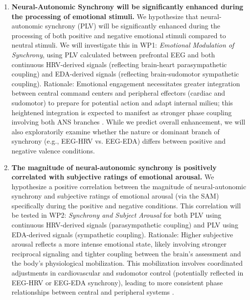 \documentclass[12pt]{article} %
\begin{document}
\begin{enumerate}[label=(\alph*)]
    \item \textbf{Neural-Autonomic Synchrony will be significantly enhanced during the processing of emotional stimuli.} We hypothesize that neural-autonomic synchrony (\gls{PLV}) will be significantly enhanced during the processing of both positive and negative emotional stimuli compared to neutral stimuli. We will investigate this in \gls{WP}1: \emph{Emotional Modulation of Synchrony}, using \gls{PLV} calculated between prefrontal \gls{EEG} and both continuous \gls{HRV}-derived signals (reflecting brain-heart parasympathetic coupling) and \gls{EDA}-derived signals (reflecting brain-sudomotor sympathetic coupling). Rationale: Emotional engagement necessitates greater integration between central command centers and peripheral effectors (cardiac and sudomotor) to prepare for potential action and adapt internal milieu; this heightened integration is expected to manifest as stronger phase coupling involving both \gls{ANS} branches \parencite{critchleyNeuralMechanismsAutonomic2005}. While we predict overall enhancement, we will also exploratorily examine whether the nature or dominant branch of synchrony (e.g., \gls{EEG}-\gls{HRV} vs. \gls{EEG}-\gls{EDA}) differs between positive and negative valence conditions.
    \item \textbf{The magnitude of neural-autonomic synchrony is positively correlated with subjective ratings of emotional arousal.} We hypothesize a positive correlation between the magnitude of neural-autonomic synchrony and subjective ratings of emotional arousal (via the \gls{SAM}) specifically during the positive and negative conditions. This correlation will be tested in \gls{WP}2: \emph{Synchrony and Subject Arousal} for both \gls{PLV} using continuous \gls{HRV}-derived signals (parasympathetic coupling) and \gls{PLV} using \gls{EDA}-derived signals (sympathetic coupling). Rationale: Higher subjective arousal reflects a more intense emotional state, likely involving stronger reciprocal signaling and tighter coupling between the brain's assessment and the body's physiological mobilization. This mobilization involves coordinated adjustments in cardiovascular and sudomotor control (potentially reflected in \gls{EEG}-\gls{HRV} or \gls{EEG}-\gls{EDA} synchrony), leading to more consistent phase relationships between central and peripheral systems \parencite{valenzaRevealingRealTimeEmotional2014, boucseinElectrodermalActivity2012}.

\end{enumerate}
\end{document}
